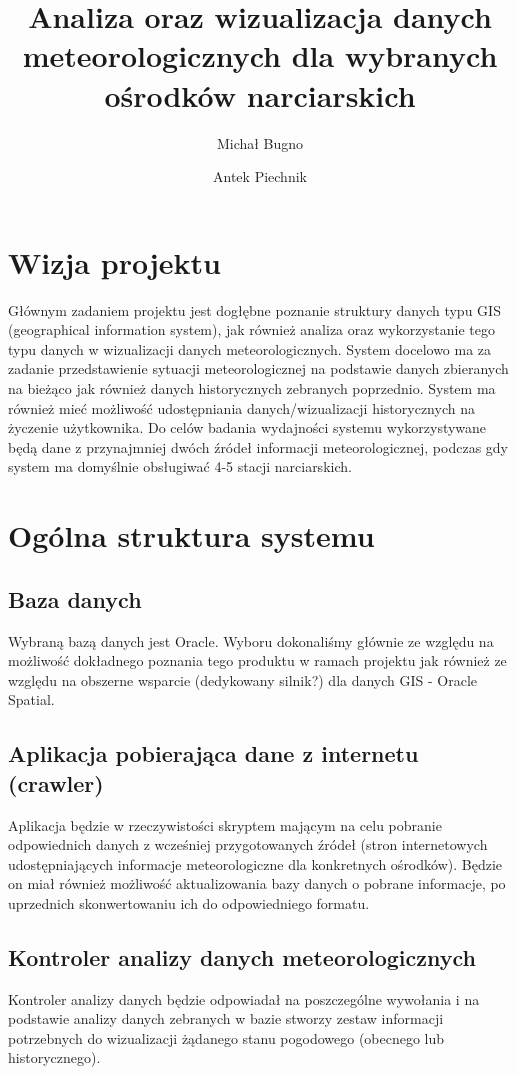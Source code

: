 \documentclass[12pt]{article}
\author{Michał Bugno \and Antek Piechnik}
\title{Analiza oraz wizualizacja danych meteorologicznych dla wybranych ośrodków narciarskich}
\begin{document}
\maketitle
\tableofcontents
\newpage

\section{Wizja projektu}
Głównym zadaniem projektu jest dogłębne poznanie struktury
danych typu GIS (geographical information system), jak również analiza oraz
wykorzystanie tego typu danych w wizualizacji danych meteorologicznych. System
docelowo ma za zadanie przedstawienie sytuacji meteorologicznej na podstawie
danych zbieranych na bieżąco jak również danych historycznych zebranych
poprzednio. System ma również mieć możliwość udostępniania danych/wizualizacji
historycznych na życzenie użytkownika. Do celów badania wydajności systemu
wykorzystywane będą dane z przynajmniej dwóch źródeł informacji
meteorologicznej, podczas gdy system ma domyślnie obsługiwać 4-5 stacji
narciarskich.

\section{Ogólna struktura systemu}

\subsection{Baza danych}
Wybraną bazą danych jest Oracle. Wyboru dokonaliśmy głównie ze względu na
możliwość dokładnego poznania tego produktu w ramach projektu jak również ze
względu na obszerne wsparcie (dedykowany silnik?) dla danych GIS - Oracle
Spatial.

\subsection{Aplikacja pobierająca dane z internetu (crawler)}
Aplikacja będzie w rzeczywistości skryptem mającym na celu pobranie
odpowiednich danych z wcześniej przygotowanych źródeł (stron internetowych
    udostępniających informacje meteorologiczne dla konkretnych ośrodków).
Będzie on miał również możliwość aktualizowania bazy danych o pobrane
informacje, po uprzednich skonwertowaniu ich do odpowiedniego formatu.

\subsection{Kontroler analizy danych meteorologicznych}
Kontroler analizy danych będzie odpowiadał na poszczególne wywołania i na
podstawie analizy danych zebranych w bazie stworzy zestaw informacji
potrzebnych do wizualizacji żądanego stanu pogodowego (obecnego lub
    historycznego).
\end{document}
